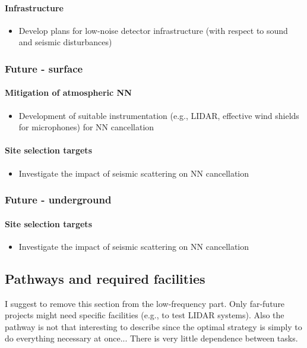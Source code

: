 \paragraph{Infrastructure}
\begin{itemize}
\item Develop plans for low-noise detector infrastructure (with respect to sound and seismic disturbances)
\end{itemize}

\subsubsection{Future - surface}
\paragraph{Mitigation of atmospheric NN}
\begin{itemize}
\item Development of suitable instrumentation (e.g., LIDAR, effective wind shields for microphones) for NN cancellation
\end{itemize}

\paragraph{Site selection targets}
\begin{itemize}
\item Investigate the impact of seismic scattering on NN cancellation
\end{itemize}

\subsubsection{Future - underground}
\paragraph{Site selection targets}
\begin{itemize}
\item Investigate the impact of seismic scattering on NN cancellation
\end{itemize}

\subsection{Pathways and required facilities}
I suggest to remove this section from the low-frequency part. Only far-future projects might need specific facilities (e.g., to test LIDAR systems). Also the pathway is not that interesting to describe since the optimal strategy is simply to do everything necessary at once... There is very little dependence between tasks.

